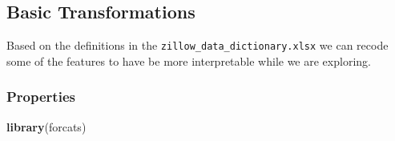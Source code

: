 \documentclass[]{book}
\newenvironment{Shaded}{\begin{snugshade}}{\end{snugshade}}
\newcommand{\KeywordTok}[1]{\textcolor[rgb]{0.13,0.29,0.53}{\textbf{#1}}}
\newcommand{\NormalTok}[1]{#1}
\theoremstyle{definition}
\theoremstyle{definition}
\theoremstyle{definition}
\theoremstyle{remark}
\begin{document}
\subsection{Basic Transformations}\label{basic-transformations}

Based on the definitions in the \texttt{zillow\_data\_dictionary.xlsx}
we can recode some of the features to have be more interpretable while
we are exploring.

\subsubsection{Properties}\label{properties}

\begin{Shaded}
\begin{Highlighting}[]
\KeywordTok{library}\NormalTok{(forcats)}


\end{Highlighting}
\end{Shaded}
\end{document}
